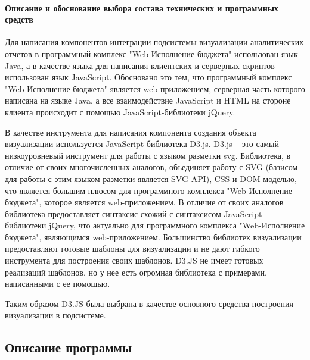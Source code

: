 \documentclass[a4paper]{extarticle}
\numberwithin{equation}{section}
\begin{document}
\paragraph{Описание и обоснование выбора состава технических и программных средств}
Для написания компонентов интеграции подсистемы визуализации аналитических отчетов в программный комплекс "Web-Исполнение бюджета" использован язык Java, а в качестве языка для написания клиентских и серверных скриптов использован язык JavaScript. Обосновано это тем, что программный комплекс "Web-Исполнение бюджета" является web-приложением, серверная часть которого написана на языке Java, а все взаимодействие JavaScript и HTML на стороне клиента происходит с помощью JavaScript-библиотеки jQuery.\par
В качестве инструмента для написания компонента создания объекта визуализации используется JavaScript-библиотека D3.js. D3.js – это самый низкоуровневый инструмент для работы с языком разметки svg. Библиотека, в отличие от своих многочисленных аналогов, объединяет работу с SVG (базисом для работы с этим языком разметки является SVG API), CSS и DOM моделью, что является большим плюсом для программного комплекса "Web-Исполнение бюджета", которое является web-приложением. В отличие от своих аналогов библиотека предоставляет синтаксис схожий с синтаксисом JavaScript-библиотеки jQuery, что актуально для программного комплекса "Web-Исполнение бюджета", являющимся web-приложением. Большинство библиотек визуализации предоставляют готовые шаблоны для визуализации и не дают гибкого инструмента для построения своих шаблонов. D3.JS не имеет готовых реализаций шаблонов, но у нее есть огромная библиотека с примерами, написанными с ее помощью.\par
Таким образом D3.JS была выбрана в качестве основного средства построения визуализации в подсистеме.

\subsection{Описание программы}
\end{document}
